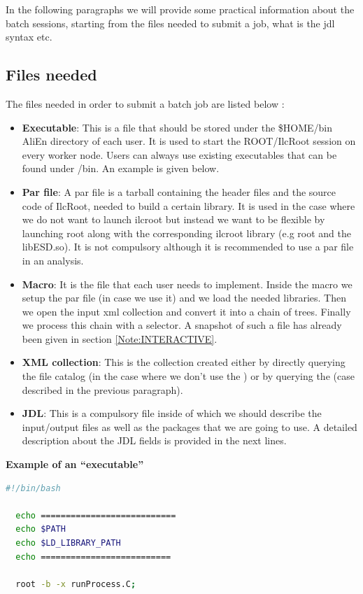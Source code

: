 In the following paragraphs we will provide some practical information about the batch sessions, starting from the files needed to submit a job, what is the jdl syntax etc.

\subsection{Files needed}

The files needed in order to submit a batch job are listed below \cite{Note:RefIlcenTutorial}:

\begin{itemize}
\item \textbf{Executable}: This is a file that should be stored under the \$HOME/bin AliEn directory of each user. It is used to start the ROOT/IlcRoot session on every worker node. Users can always use existing executables that can be found under /bin. An example is given below.
\item \textbf{Par file}: A {\ttfamily par file} is a tarball containing the header files and the source code of IlcRoot, needed to build a certain library. It is used in the case where we do not want to launch ilcroot but instead we want to be flexible by launching root along with the corresponding ilcroot library (e.g root and the libESD.so). It is not compulsory although it is recommended to use a par file in an analysis.
\item \textbf{Macro}: It is the file that each user needs to implement. Inside the macro we setup the par file (in case we use it) and we load the needed libraries. Then we open the input xml collection and convert it into a chain of trees. Finally we process this chain with a selector. A snapshot of such a file has already been given in section \ref{Note:INTERACTIVE}.
\item \textbf{XML collection}: This is the collection created either by directly querying the file catalog (in the case where we don't use the \tag) or by querying the \tag (case described in the previous paragraph).
\item \textbf{JDL}: This is a compulsory file inside of which we should describe the input/output files as well as the packages that we are going to use. A detailed description about the JDL fields is provided in the next lines.
\end{itemize}

\textbf{Example of an ``executable''}
\begin{lstlisting}[language=bash]
  #!/bin/bash
  
  echo ===========================
  echo $PATH
  echo $LD_LIBRARY_PATH
  echo ==========================
  
  root -b -x runProcess.C;
\end{lstlisting}

